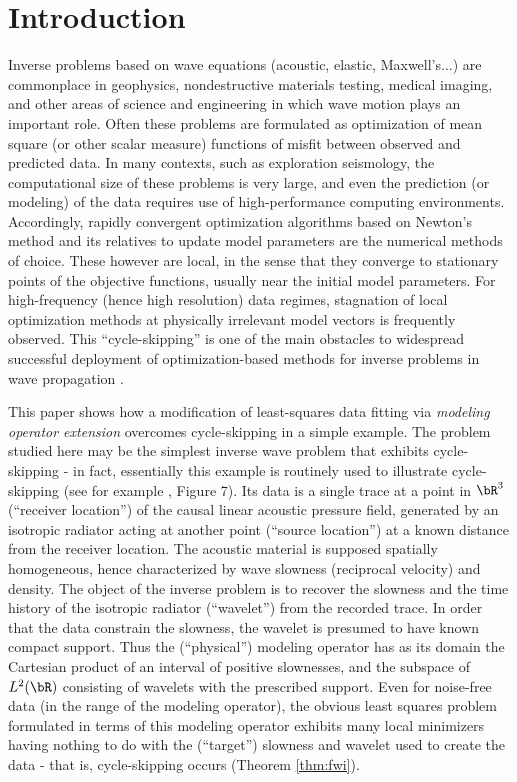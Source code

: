 \section{Introduction}
Inverse problems based on wave equations (acoustic, elastic,
Maxwell's...) are commonplace in geophysics, nondestructive materials
testing, medical imaging, and other areas of science and engineering
in which wave motion plays an important role. Often these problems are
formulated as optimization of mean square (or other scalar measure)
functions of misfit between observed and predicted data. In many
contexts, such as exploration seismology, the computational size of
these problems is very large, and even the prediction (or modeling) of
the data requires use of high-performance computing
environments. Accordingly, rapidly convergent optimization algorithms
based on Newton's method and its relatives to update model parameters
are the numerical methods of choice. These however are local, in the
sense that they converge to stationary points of the objective
functions, usually near the initial model parameters. For
high-frequency (hence high resolution) data regimes, stagnation of
local optimization methods at physically irrelevant model vectors is
frequently observed. This ``cycle-skipping'' is one of the main
obstacles to widespread successful deployment of optimization-based
methods for inverse problems in wave propagation
\cite[]{GauTarVir:86,VirieuxOperto:09,Fichtner:10,Plessix:10,Schuster:17}.

This paper shows how a modification of least-squares data fitting via
{\em modeling operator extension} overcomes cycle-skipping in a simple
example. The problem studied here may be the simplest inverse wave
problem that exhibits cycle-skipping - in fact, essentially this
example is routinely used to illustrate cycle-skipping (see for
example \cite{VirieuxOperto:09}, Figure 7). Its data is a single trace
at a point in $\bR^3$ (``receiver location'') of the causal linear
acoustic pressure field, generated by an isotropic radiator acting at
another point (``source location'') at a known distance from the
receiver location. The acoustic material is supposed spatially
homogeneous, hence characterized by wave slowness (reciprocal
velocity) and density. The object of the inverse problem is to recover
the slowness and the time history of the isotropic radiator
(``wavelet'') from the recorded trace. In order that the data
constrain the slowness, the wavelet is presumed to have known compact
support. Thus the (``physical'') modeling operator has as its domain
the Cartesian product of an interval of positive slownesses, and the
subspace of $L^2(\bR)$ consisting of wavelets with the prescribed
support. Even for noise-free data (in the range of the modeling
operator), the obvious least squares problem formulated in terms of
this modeling operator exhibits many local minimizers having nothing
to do with the (``target'') slowness and wavelet used to create the
data - that is, cycle-skipping occurs (Theorem \ref{thm:fwi}).

